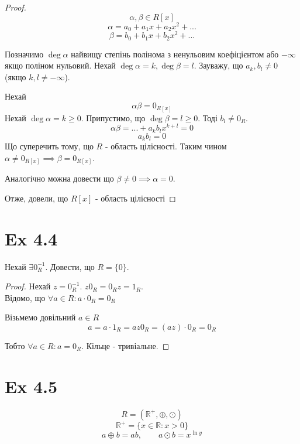 \documentclass[11pt, a4paper]{article} %
\newcommand{\R}{\mathbb{R}}
\begin{document}
\begin{proof}
    \[\alpha,\beta \in R[x]\]
    \[\alpha = a_0 + a_1x + a_2x^2 + ...\]
    \[\beta = b_0 + b_1x + b_2x^2 + ...\]
    
    Позначимо $\deg \alpha$ найвищу степінь полінома з ненульовим коефіцієнтом або $-\infty$ якщо поліном нульовий.
    Нехай $\deg \alpha = k, \deg \beta = l$.
    Зауважу, що $a_k,b_l\ne 0$ (якщо $k,l\ne-\infty$).

    Нехай
    \[\alpha\beta = 0_{R[x]}\]
    Нехай $\deg \alpha = k \ge 0$.
    Припустимо, що $\deg \beta = l \ge 0$. Тоді $b_l \ne 0_R$.
    \[\alpha\beta = ... + a_kb_lx^{k+l} = 0\]
    \[a_kb_l = 0\]
    Що суперечить тому, що $R$ - область цілісності.
    Таким чином $\alpha \ne 0_{R[x]} \implies \beta = 0_{R[x]}$.

    Аналогічно можна довести що $\beta \ne 0 \implies \alpha = 0$.

    Отже, довели, що $R[x]$ - область цілісності
\end{proof}

\section*{Ex 4.4}
\begin{mdframed}
Нехай $\exists 0_R^{-1}$. Довести, що $R = \{0\}$.   
\end{mdframed}
\begin{proof}
    Нехай $z = 0_R^{-1}$. $z0_R = 0_Rz = 1_R$.\\
    Відомо, що $\forall a\in R: a\cdot 0_R = 0_R$

    Візьмемо довільний $a\in R$
    \[a = a \cdot 1_R = az0_R = (az)\cdot 0_R = 0_R\]

    Тобто $\forall a\in R: a=0_R$.
    Кільце - тривіальне.
\end{proof}

\newpage
\section*{Ex 4.5}
\begin{mdframed}
    \[R = (\R^+, \oplus, \odot)\]
    \[\R^+ = \{x\in\R: x>0\}\]
    \[a \oplus b = ab, \qquad a \odot b = x^{\ln y}\]
\end{mdframed}
\end{document}
